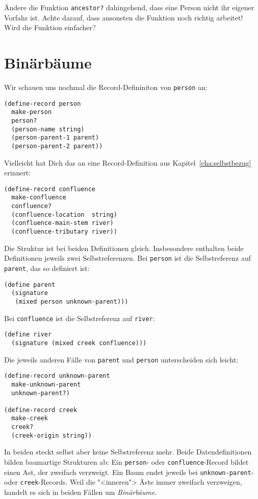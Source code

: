 \begin{aufgabeinline}
  Ändere die Funktion \lstinline{ancestor?} dahingehend, dass eine
  Person nicht ihr eigener Vorfahr ist.
  Achte darauf, dass ansonsten die Funktion noch richtig arbeitet!
  Wird die Funktion einfacher?
\end{aufgabeinline}

\section{Binärbäume}
\label{sec:trees}

%
Wir schauen uns nochmal die Record-Defininiton von \lstinline{person}
an:
%
\begin{lstlisting}
(define-record person
  make-person
  person?
  (person-name string)
  (person-parent-1 parent)
  (person-parent-2 parent))
\end{lstlisting}
%
Vielleicht hat Dich das an eine Record-Definition aus
Kapitel~\ref{cha:selbstbezug} erinnert:
%
\begin{lstlisting}
(define-record confluence
  make-confluence
  confluence?
  (confluence-location  string)
  (confluence-main-stem river)
  (confluence-tributary river))
\end{lstlisting}
%
Die Struktur ist bei beiden Definitionen gleich.  Insbesondere
enthalten beide Definitionen jeweils zwei Selbstreferenzen.  Bei
\lstinline{person} ist die Selbstreferenz auf \lstinline{parent}, das
so definiert ist:
%
\begin{lstlisting}
(define parent
  (signature
   (mixed person unknown-parent)))
\end{lstlisting}
% 
Bei \lstinline{confluence} ist die Selbstreferenz auf
\lstinline{river}:
%
\begin{lstlisting}
(define river
  (signature (mixed creek confluence)))
\end{lstlisting}
%
Die jeweils anderen Fälle von \lstinline{parent} und
\lstinline{person} unterscheiden sich leicht:
%
\begin{lstlisting}
(define-record unknown-parent
  make-unknown-parent
  unknown-parent?)

(define-record creek
  make-creek
  creek?
  (creek-origin string))
\end{lstlisting}
%
In beiden steckt selbst aber keine Selbstreferenz mehr.  Beide
Datendefinitionen bilden baumartige Strukturen ab: Ein
\lstinline{person}- oder \lstinline{confluence}-Record bildet einen
Ast, der zweifach verzweigt.  Ein Baum endet jeweils bei
\lstinline{unknown-parent}- oder \lstinline{creek}-Records.  Weil die
"<inneren"> Äste immer zweifach verzweigen, handelt es sich in beiden
Fällen um \textit{Binärbäume}.  

